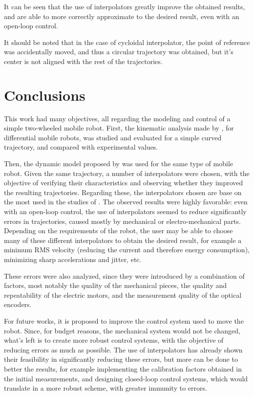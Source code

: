 \documentclass[a4paper]{aadeca}
\begin{document}
It can be seen that the use of interpolators greatly improve the obtained results, and are able to more correctly approximate to the desired result, even with an open-loop control.

It should be noted that in the case of cycloidal interpolator, the point of reference was accidentally moved, and thus a circular trajectory was obtained, but it's center is not aligned with the rest of the trajectories.

\section{Conclusions}

This work had many objectives, all regarding the modeling and control of a simple two-wheeled mobile robot.
First, the kinematic analysis made by \cite{dudek_computational_2010}, for differential mobile robots, was studied and evaluated for a simple curved trajectory, and compared with experimental values.
 
Then, the dynamic model proposed by \cite{ivanjko_modelling_2010} was used for the same type of mobile robot.
Given the same trajectory, a number of interpolators were chosen, with the objective of verifying their characteristics and observing whether they improved the resulting trajectories.
Regarding these, the interpolators chosen are base on the most used in the studies of \cite{canini_controllo_2003}.
The observed results were highly favorable: even with an open-loop control, the use of interpolators seemed to reduce significantly errors in trajectories, caused mostly by mechanical or electro-mechanical parts.
Depending on the requirements of the robot, the user may be able to choose many of these different interpolators to obtain the desired result, for example a minimum RMS velocity (reducing the current and therefore energy consumption), minimizing sharp accelerations and jitter, etc.

These errors were also analyzed, since they were introduced by a combination of factors, most notably the quality of the mechanical pieces, the quality and repeatability of the electric motors, and the measurement quality of the optical encoders.

For future works, it is proposed to improve the control system used to move the robot.
Since, for budget reasons, the mechanical system would not be changed, what's left is to create more robust control systems, with the objective of reducing errors as much as possible.
The use of interpolators has already shown their feasibility in significantly reducing these errors, but more can be done to better the results, for example implementing the calibration factors obtained in the initial measurements, and designing closed-loop control systems, which would translate in a more robust scheme, with greater immunity to errors.
\end{document}
